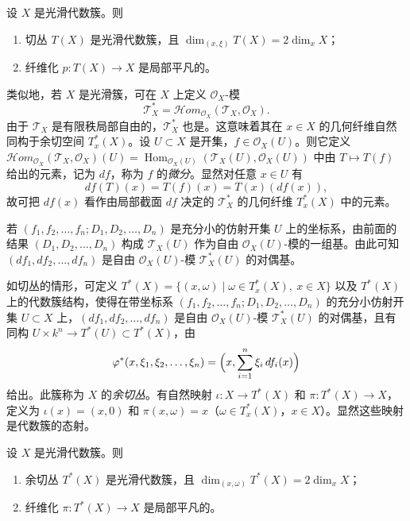 \begin{proposition}
设 $X$ 是光滑代数簇。则
\begin{enumerate}[label=(\roman*)]
  \item 切丛 $T(X)$ 是光滑代数簇，且 $\dim_{(x,\xi)}T(X)=2\dim_xX$；
  \item 纤维化 $p:T(X)\to X$ 是局部平凡的。
\end{enumerate}
\end{proposition}

类似地，若 $X$ 是光滑簇，可在 $X$ 上定义 $\mathcal{O}_X$-模
$$\mathcal{T}^*_X=\mathcal{H}om_{\mathcal{O}_X}(\mathcal{T}_X,\mathcal{O}_X).$$
由于 $\mathcal{T}_X$ 是有限秩局部自由的，$\mathcal{T}^*_X$ 也是。这意味着其在 $x\in X$ 的几何纤维自然同构于余切空间 $T^*_x(X)$。设 $U\subset X$ 是开集，$f\in\mathcal{O}_X(U)$。则它定义 $\mathcal{H}om_{\mathcal{O}_X}(\mathcal{T}_X,\mathcal{O}_X)(U)=\operatorname{Hom}_{\mathcal{O}_X(U)}(\mathcal{T}_X(U),\mathcal{O}_X(U))$ 中由 $T\longmapsto T(f)$ 给出的元素，记为 $df$，称为 $f$ 的\emph{微分}。显然对任意 $x\in U$ 有
$$df(T)(x)=T(f)(x)=T(x)(df(x)),$$
故可把 $df(x)$ 看作由局部截面 $df$ 决定的 $\mathcal{T}^*_X$ 的几何纤维 $T^*_x(X)$ 中的元素。

若 $(f_1,f_2,\dots,f_n;D_1,D_2,\dots,D_n)$ 是充分小的仿射开集 $U$ 上的坐标系，由前面的结果 $(D_1,D_2,\dots,D_n)$ 构成 $\mathcal{T}_X(U)$ 作为自由 $\mathcal{O}_X(U)$-模的一组基。由此可知 $(df_1,df_2,\dots,df_n)$ 是自由 $\mathcal{O}_X(U)$-模 $\mathcal{T}^*_X(U)$ 的对偶基。

如切丛的情形，可定义 $T^*(X)=\{(x,\omega)\mid \omega\in T^*_x(X),\ x\in X\}$ 以及 $T^*(X)$ 上的代数簇结构，使得在带坐标系 $(f_1,f_2,\dots,f_n;D_1,D_2,\dots,D_n)$ 的充分小仿射开集 $U\subset X$ 上，$(df_1,df_2,\dots,df_n)$ 是自由 $\mathcal{O}_X(U)$-模 $\mathcal{T}^*_X(U)$ 的对偶基，且有同构 $U\times k^n\to T^*(U)\subset T^*(X)$，由
$$\varphi^*(x,\xi_1,\xi_2,\dots,\xi_n)=\Bigl(x,\sum_{i=1}^n\xi_i\,df_i(x)\Bigr)$$
给出。此簇称为 $X$ 的\emph{余切丛}。有自然映射 $\iota:X\to T^*(X)$ 和 $\pi:T^*(X)\to X$，定义为 $\iota(x)=(x,0)$ 和 $\pi(x,\omega)=x$（$\omega\in T^*_x(X)$，$x\in X$）。显然这些映射是代数簇的态射。

\begin{proposition}
设 $X$ 是光滑代数簇。则
\begin{enumerate}[label=(\roman*)]
  \item 余切丛 $T^*(X)$ 是光滑代数簇，且 $\dim_{(x,\omega)}T^*(X)=2\dim_xX$；
  \item 纤维化 $\pi:T^*(X)\to X$ 是局部平凡的。
\end{enumerate}
\end{proposition}

